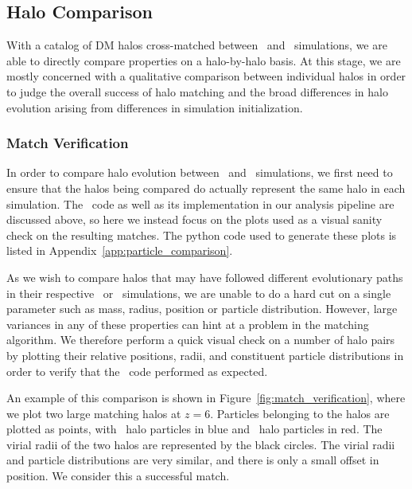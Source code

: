 \subsection{Halo Comparison}
\label{subsec:analysis--halo_comparison}


With a catalog of DM halos cross-matched between \lpt\ and \za\ simulations, we are able to directly compare properties on a halo-by-halo basis.  At this stage, we are mostly concerned with a qualitative comparison between individual halos in order to judge the overall success of halo matching and the broad differences in halo evolution arising from differences in simulation initialization.



\subsubsection{Match Verification}
\label{subsubsec:analysis--halo_comparison--match_verification}


In order to compare halo evolution between \lpt\ and \za\ simulations, we first need to ensure that the halos being compared do actually represent the same halo in each simulation.  The \crossmatch\ code as well as its implementation in our analysis pipeline are discussed above, so here we instead focus on the plots used as a visual sanity check on the resulting matches.  The python code used to generate these plots is listed in Appendix~\ref{app:particle_comparison}.

As we wish to compare halos that may have followed different evolutionary paths in their respective \lpt\ or \za\ simulations, we are unable to do a hard cut on a single parameter such as mass, radius, position or particle distribution.  However, large variances in any of these properties can hint at a problem in the matching algorithm.  We therefore perform a quick visual check on a number of halo pairs by plotting their relative positions, radii, and constituent particle distributions in order to verify that the \crossmatch\ code performed as expected.

An example of this comparison is shown in Figure~\ref{fig:match_verification}, where we plot two large matching halos at $z = 6$.  Particles belonging to the halos are plotted as points, with \lpt\ halo particles in blue and \za\ halo particles in red.  The virial radii of the two halos are represented by the black circles.  The virial radii and particle distributions are very similar, and there is only a small offset in position.  We consider this a successful match.

